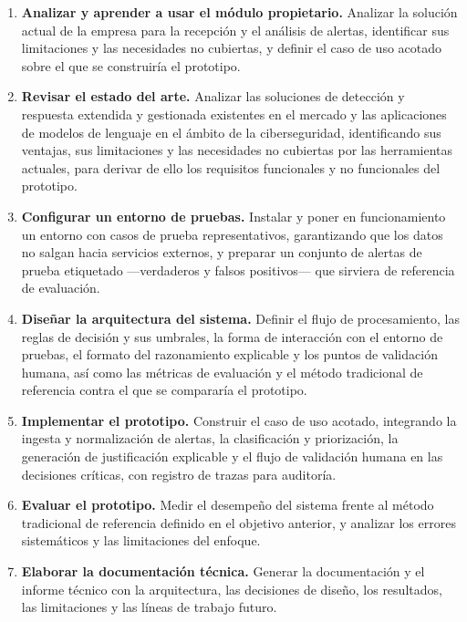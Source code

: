 \begin{enumerate}
  \item \textbf{Analizar y aprender a usar el módulo propietario.} Analizar la solución actual de
        la empresa para la recepción y el análisis de alertas, identificar sus limitaciones y las
        necesidades no cubiertas, y definir el caso de uso acotado sobre el que se construiría el
        prototipo.

  \item \textbf{Revisar el estado del arte.} Analizar las soluciones de detección y respuesta
        extendida y gestionada existentes en el mercado y las aplicaciones de modelos de lenguaje
        en el ámbito de la ciberseguridad, identificando sus ventajas, sus limitaciones y las
        necesidades no cubiertas por las herramientas actuales, para derivar de ello los
        requisitos funcionales y no funcionales del prototipo.

  \item \textbf{Configurar un entorno de pruebas.} Instalar y poner en funcionamiento un entorno
        con casos de prueba representativos, garantizando que los datos no salgan hacia servicios
        externos, y preparar un conjunto de alertas de prueba etiquetado ---verdaderos y falsos
        positivos--- que sirviera de referencia de evaluación.

  \item \textbf{Diseñar la arquitectura del sistema.} Definir el flujo de procesamiento, las
        reglas de decisión y sus umbrales, la forma de interacción con el entorno de pruebas, el
        formato del razonamiento explicable y los puntos de validación humana, así como las
        métricas de evaluación y el método tradicional de referencia contra el que se compararía
        el prototipo.

  \item \textbf{Implementar el prototipo.} Construir el caso de uso acotado, integrando la
        ingesta y normalización de alertas, la clasificación y priorización, la generación de
        justificación explicable y el flujo de validación humana en las decisiones críticas, con
        registro de trazas para auditoría.

  \item \textbf{Evaluar el prototipo.} Medir el desempeño del sistema frente al método tradicional
        de referencia definido en el objetivo anterior, y analizar los errores sistemáticos y las
        limitaciones del enfoque.

  \item \textbf{Elaborar la documentación técnica.} Generar la documentación y el informe técnico
        con la arquitectura, las decisiones de diseño, los resultados, las limitaciones y las
        líneas de trabajo futuro.
\end{enumerate}

